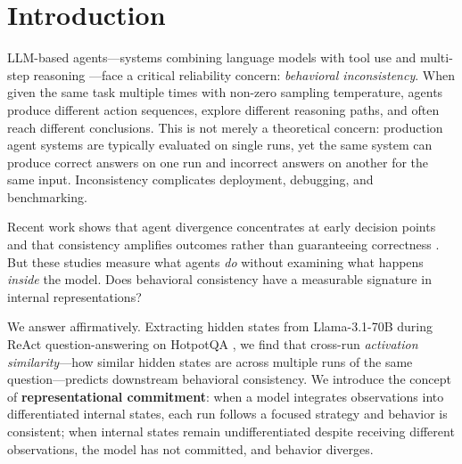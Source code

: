 \documentclass{article}
\begin{document}
\section{Introduction}

LLM-based agents---systems combining language models with tool use and multi-step reasoning \citep{react, cot}---face a critical reliability concern: \emph{behavioral inconsistency}. When given the same task multiple times with non-zero sampling temperature, agents produce different action sequences, explore different reasoning paths, and often reach different conclusions. This is not merely a theoretical concern: production agent systems are typically evaluated on single runs, yet the same system can produce correct answers on one run and incorrect answers on another for the same input. Inconsistency complicates deployment, debugging, and benchmarking.

Recent work shows that agent divergence concentrates at early decision points \citep{anonymous2026a} and that consistency amplifies outcomes rather than guaranteeing correctness \citep{anonymous2026b}. But these studies measure what agents \emph{do} without examining what happens \emph{inside} the model. Does behavioral consistency have a measurable signature in internal representations?

We answer affirmatively. Extracting hidden states from Llama-3.1-70B \citep{llama3} during ReAct \citep{react} question-answering on HotpotQA \citep{hotpotqa}, we find that cross-run \emph{activation similarity}---how similar hidden states are across multiple runs of the same question---predicts downstream behavioral consistency. We introduce the concept of \textbf{representational commitment}: when a model integrates observations into differentiated internal states, each run follows a focused strategy and behavior is consistent; when internal states remain undifferentiated despite receiving different observations, the model has not committed, and behavior diverges.
\end{document}
